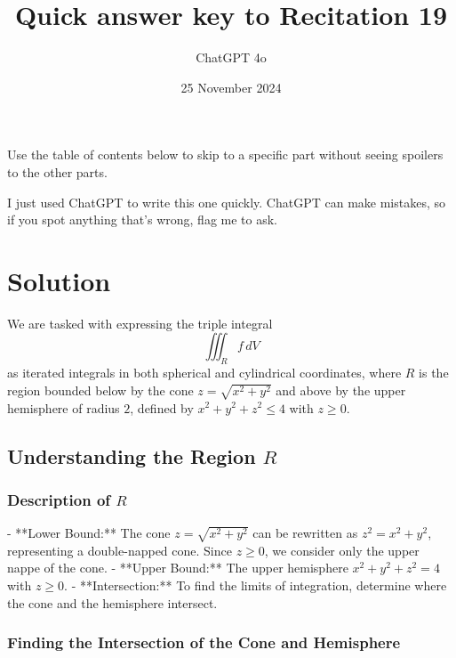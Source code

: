 \documentclass[11pt]{article}
\begin{document}
\title{Quick answer key to Recitation 19}
\author{ChatGPT 4o}
\date{25 November 2024}
\maketitle

Use the table of contents below to skip to a specific part
without seeing spoilers to the other parts.

I just used ChatGPT to write this one quickly.
ChatGPT can make mistakes, so if you spot anything that's wrong, flag me to ask.

\tableofcontents



\newpage

\section{Solution}

We are tasked with expressing the triple integral
\[
\iiint_{R} f \, dV
\]
as iterated integrals in both spherical and cylindrical coordinates, where \( R \) is the region bounded below by the cone \( z = \sqrt{x^2 + y^2} \) and above by the upper hemisphere of radius \( 2 \), defined by \( x^2 + y^2 + z^2 \leq 4 \) with \( z \geq 0 \).

\newpage

\subsection{Understanding the Region \( R \)}

\newpage

\subsubsection{Description of \( R \)}
- **Lower Bound:** The cone \( z = \sqrt{x^2 + y^2} \) can be rewritten as \( z^2 = x^2 + y^2 \), representing a double-napped cone. Since \( z \geq 0 \), we consider only the upper nappe of the cone.
- **Upper Bound:** The upper hemisphere \( x^2 + y^2 + z^2 = 4 \) with \( z \geq 0 \).
- **Intersection:** To find the limits of integration, determine where the cone and the hemisphere intersect.

\newpage

\subsubsection{Finding the Intersection of the Cone and Hemisphere}
\end{document}
